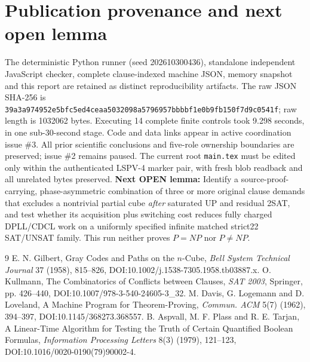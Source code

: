 \documentclass[10pt]{article}
\begin{document}
\section{Publication provenance and next open lemma}
The deterministic Python runner (seed 202610300436), standalone independent JavaScript checker, complete clause-indexed machine JSON, memory snapshot and this report are retained as distinct reproducibility artifacts. The raw JSON SHA-256 is \texttt{39a3a974952e5bfc5ed4ceaa5032098a5796957bbbbf1e0b9fb150f7d9c0541f}; raw length is 1032062 bytes. Executing 14 complete finite controls took 9.298 seconds, in one sub-30-second stage. Code and data links appear in active coordination issue \#3. All prior scientific conclusions and five-role ownership boundaries are preserved; issue \#2 remains paused. The current root \texttt{main.tex} must be edited only within the authenticated LSPV-4 marker pair, with fresh blob readback and all unrelated bytes preserved.
\noindent\textbf{Next OPEN lemma:} Identify a source-proof-carrying, phase-asymmetric combination of three or more original clause demands that excludes a nontrivial partial cube \emph{after} saturated UP and residual 2SAT, and test whether its acquisition plus switching cost reduces fully charged DPLL/CDCL work on a uniformly specified infinite matched strict22 SAT/UNSAT family. This run neither proves $P=NP$ nor $P\ne NP$.
\begin{thebibliography}{9}
 E. N. Gilbert, Gray Codes and Paths on the $n$-Cube, \emph{Bell System Technical Journal} 37 (1958), 815--826, DOI:10.1002/j.1538-7305.1958.tb03887.x.
 O. Kullmann, The Combinatorics of Conflicts between Clauses, \emph{SAT 2003}, Springer, pp. 426--440, DOI:10.1007/978-3-540-24605-3\_32.
 M. Davis, G. Logemann and D. Loveland, A Machine Program for Theorem-Proving, \emph{Commun. ACM} 5(7) (1962), 394--397, DOI:10.1145/368273.368557.
 B. Aspvall, M. F. Plass and R. E. Tarjan, A Linear-Time Algorithm for Testing the Truth of Certain Quantified Boolean Formulas, \emph{Information Processing Letters} 8(3) (1979), 121--123, DOI:10.1016/0020-0190(79)90002-4.
\end{thebibliography}
\end{document}
